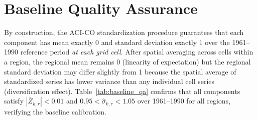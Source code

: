 \documentclass[12pt]{article}
\begin{document}
\section{Baseline Quality Assurance}\label{app:baseline_qa}
 
By construction, the ACI-CO standardization procedure guarantees that each component has mean exactly 0 and standard deviation exactly 1 over the 1961--1990 reference period \emph{at each grid cell}. After spatial averaging across cells within a region, the regional mean remains 0 (linearity of expectation) but the regional standard deviation may differ slightly from 1 because the spatial average of standardized series has lower variance than any individual cell series (diversification effect). Table~\ref{tab:baseline_qa} confirms that all components satisfy $|\bar{Z}_{k,r}| < 0.01$ and $0.95 < \hat{\sigma}_{k,r} < 1.05$ over 1961--1990 for all regions, verifying the baseline calibration.

\begin{table}[H]
\centering\small
\renewcommand{\arraystretch}{1.15}
\caption{Baseline quality assurance: mean and standard deviation of each standardized ACI-CO component over the 1961--1990 reference period, by region. Values close to 0 and 1 confirm correct baseline calibration.}
\label{tab:baseline_qa}
\end{table}
 
\end{document}
